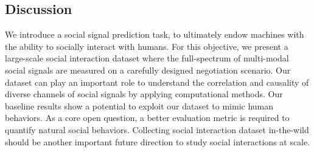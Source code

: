





\subsection{Discussion}
We introduce a social signal prediction task, to ultimately endow machines with the ability to socially interact with humans. For this objective, we present a large-scale social interaction dataset where the full-spectrum of multi-modal social signals are measured on a carefully designed negotiation scenario. Our dataset can play an important role to understand the correlation and causality of diverse channels of social signals by applying computational methods. Our baseline results show a potential to exploit our dataset to mimic human behaviors. As a core open question, a better evaluation metric is required to quantify natural social behaviors. Collecting social interaction dataset in-the-wild should be another important future direction to study social interactions at scale. %








